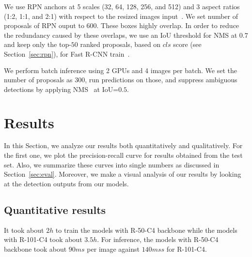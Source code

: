 We use RPN anchors at 5 scales (32, 64, 128, 256, and 512) and 3 aspect ratios (1:2, 1:1, and 2:1) with respect to the resized images input~\cite{Lin2017pyramid}.
We set number of proposals of RPN ouput to $600$.
These boxes highly overlap.
In order to reduce the redundancy caused by these overlaps,
we use an IoU threshold for NMS at $0.7$ and keep only the top-$50$ ranked proposals, based on $cls$ score (see Section~\ref{sec:rpn}), for Fast R-CNN train~\cite{Ren2017fasterpami}.

We perform batch inference using 2 GPUs and 4 images per batch.
We set the number of proposals as 300, run predictions on those, and suppress ambiguous detections by applying NMS~\cite{Girshick2015DPM} at IoU=$0.5$.

\section{Results}
%
In this Section, we analyze our results both quantitatively and qualitatively.
For the first one, we plot the precision-recall curve for results obtained from the test set.
Also, we summarize these curves into single numbers as discussed in Section~\ref{sec:eval}.
Moreover, we make a visual analysis of our results by looking at the detection outputs from our models.


\subsection{Quantitative results}
%
It took about $2h$ to train the models with R-50-C4 backbone while the models with R-101-C4 took about $3.5h$.
For inference, the models with R-50-C4 backbone took about $90ms$ per image against $140mss$ for R-101-C4.
%

